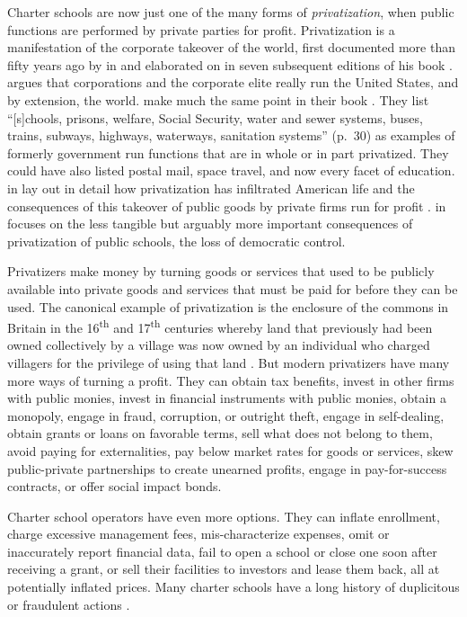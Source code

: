 Charter schools are now just one of the many forms of \textit{privatization}, when public functions are performed by private parties for profit. Privatization is a manifestation of the corporate takeover of the world, first documented more than fifty years ago by \citeauthor{Domhoff2014} in and elaborated on in seven subsequent editions of his book . \citeauthor{Domhoff2014} argues that corporations and the corporate elite really run the United States, and by extension, the world. \textcite{Kahn.Minnich2005} make much the same point in their book  \parencite{Kahn.Minnich2005}. They list ``[s]chools, prisons, welfare, Social Security, water and sewer systems, buses, trains, subways, highways, waterways, sanitation systems'' (p.~30) as examples of formerly government run functions that are in whole or in part privatized. They could have also listed postal mail, space travel, and now every facet of education. \citeauthor{Cohen.Mikaelian2021} in  lay out in detail how privatization has infiltrated American life and the consequences of this takeover of public goods by private firms run for profit  \parencite{Cohen.Mikaelian2021}. \citeauthor{Black2020} in  \parencite{Black2020} focuses on the less tangible but arguably more important consequences of privatization of public schools, the loss of democratic control.

Privatizers make money by turning goods or services that used to be publicly available into private goods and services that must be paid for before they can be used. The canonical example of privatization is the enclosure of the commons in Britain in the 16\textsuperscript{th} and 17\textsuperscript{th} centuries whereby land that previously had been owned collectively by a village was now owned by an individual who charged villagers for the privilege of using that land \parencite{SimonFairlie2009}. But modern privatizers have many more ways of turning a profit. They can obtain tax benefits, invest in other firms with public monies, invest in financial instruments with public monies, obtain a monopoly, engage in fraud, corruption, or outright theft, engage in self-dealing, obtain grants or loans on favorable terms, sell what does not belong to them, avoid paying for externalities, pay below market rates for goods or services, skew public-private partnerships to create unearned profits, engage in pay-for-success contracts, or offer social impact bonds.

Charter school operators have even more options. They can inflate enrollment, charge excessive management fees, mis-characterize expenses, omit or inaccurately report financial data, fail to open a school or close one soon after receiving a grant, or sell their facilities to investors and lease them back, all at potentially inflated prices. Many charter schools have a long history of duplicitous or fraudulent actions \parencite{Baker.Miron2015,ITPI2018, Burris.Bryant2020, Lafer.etal2021}.

